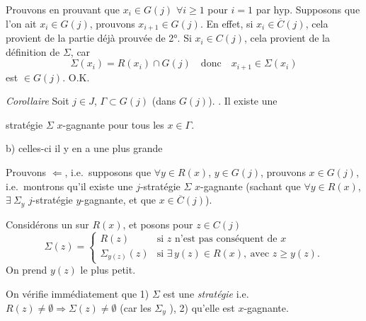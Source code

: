 \documentclass[11pt,a4paper]{article}
\begin{document}
Prouvons en prouvant  que $x_i\in G(j)$ $\forall i\geqslant 1$   pour $i=1$ par hyp. Supposons que \struck{\ill} l'on ait $x_i\in G(j)$, prouvons $x_{i+1}\in G(j)$. En effet, si $x_i\in\overline{C}(j)$, cela provient de la partie déjà prouvée de 2°. Si $x_i\in C(j)$, cela provient de la définition de $\Sigma$, car
\[
  \Sigma(x_i)=R(x_i)\cap G(j) \quad\text{donc}\quad x_{i+1}\in\Sigma(x_i)
\]
 est $\in G(j)$. O.K.

\emph{Corollaire}   Soit $j\in J$, $\Gamma\subset G(j)$  (dans $G(j)$).   . Il existe une

 stratégie $\Sigma$ \ill{} $x$-gagnante pour tous les $x\in\Gamma$.

b)  celles-ci il y en a une plus grande

Prouvons $\Longleftarrow$, i.e.\ supposons que $\forall y\in R(x)$, \ill{} $y\in G(j)$, prouvons $x\in G(j)$, i.e.\ montrons qu'il existe une $j$-stratégie $\Sigma$ $x$-gagnante (sachant que  $\forall y\in R(x)$, $\exists\ \Sigma_y$  $j$-stratégie $y$-gagnante, et que $x\in\overline{C}(j)$).

Considérons un  sur $R(x)$, et posons pour $z\in C(j)$
\[
  \Sigma(z)=\begin{cases}
    R(z) & \text{si } z \text{ n'est pas conséquent de } x\\
    \Sigma_{y(z)}(z) & \text{si } \exists\, y(z)\in R(x),\ \text{avec } z\geqslant y(z).
  \end{cases}
\]
On prend $y(z)$ le plus petit.

On vérifie immédiatement que 1) $\Sigma$ est une \emph{stratégie} i.e.\ $R(z)\neq\emptyset\Longrightarrow\Sigma(z)\neq\emptyset$ (car les $\Sigma_y$ ), 2) qu'elle est $x$-gagnante.

\end{document}
